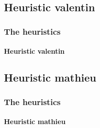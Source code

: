 \documentclass[a4paper, 11pt]{beamer}
\begin{document}
\subsection{Heuristic valentin}
\begin{frame}
 \frametitle{The heuristics}
 \framesubtitle{Heuristic valentin}
 
\end{frame}

\subsection{Heuristic mathieu}
\begin{frame}
 \frametitle{The heuristics}
 \framesubtitle{Heuristic mathieu}
 \begin{table}[htbp]
  \centering
  \begin{tabular}{c c}

\end{tabular}
\end{table}
\end{frame}
\end{document}
